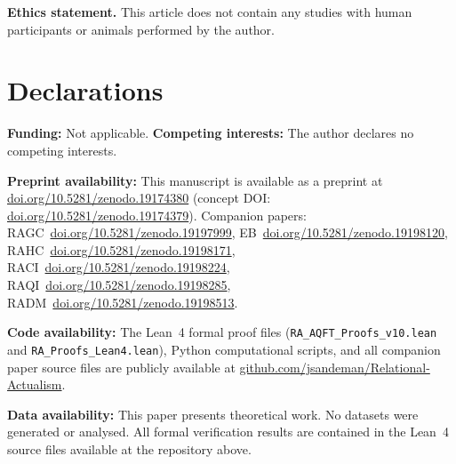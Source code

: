 \documentclass[11pt,a4paper]{article}
\theoremstyle{plain}
\theoremstyle{definition}
\theoremstyle{remark}
\begin{document}
\smallskip\noindent
\textbf{Ethics statement.}
This article does not contain any studies with human participants
or animals performed by the author.

\section*{Declarations}
\textbf{Funding:} Not applicable.\quad
\textbf{Competing interests:} The author declares no competing interests.

\textbf{Preprint availability:} This manuscript is available as a preprint at
\href{https://doi.org/10.5281/zenodo.19174380}{doi.org/10.5281/zenodo.19174380}
(concept DOI: \href{https://doi.org/10.5281/zenodo.19174379}{doi.org/10.5281/zenodo.19174379}).
Companion papers: RAGC~\href{https://doi.org/10.5281/zenodo.19197999}{doi.org/10.5281/zenodo.19197999}, EB~\href{https://doi.org/10.5281/zenodo.19198120}{doi.org/10.5281/zenodo.19198120}, RAHC~\href{https://doi.org/10.5281/zenodo.19198171}{doi.org/10.5281/zenodo.19198171}, RACI~\href{https://doi.org/10.5281/zenodo.19198224}{doi.org/10.5281/zenodo.19198224}, RAQI~\href{https://doi.org/10.5281/zenodo.19198285}{doi.org/10.5281/zenodo.19198285}, RADM~\href{https://doi.org/10.5281/zenodo.19198513}{doi.org/10.5281/zenodo.19198513}.

\textbf{Code availability:} The Lean~4 formal proof files
(\texttt{RA\_AQFT\_Proofs\_v10.lean} and \texttt{RA\_Proofs\_Lean4.lean}),
Python computational scripts, and all companion paper source files are publicly
available at \href{https://github.com/jsandeman/Relational-Actualism}{github.com/jsandeman/Relational-Actualism}.

\textbf{Data availability:} This paper presents theoretical work. No datasets
were generated or analysed. All formal verification results are contained in the
Lean~4 source files available at the repository above.
\end{document}

